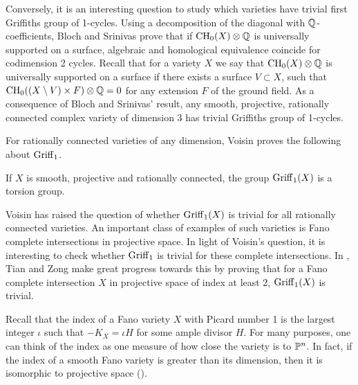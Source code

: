 Conversely, it is an interesting question to study which varieties have trivial first Griffiths group of 1-cycles. Using a decomposition of the diagonal with $\Q$-coefficients, Bloch and Srinivas \cite{BSCorrespondences} prove that if $\CH_0(X) \otimes \Q$ is universally supported on a surface,
algebraic and homological equivalence coincide for codimension 2 cycles. Recall that for a variety $X$ we say that $\CH_0(X) \otimes \Q$ is universally supported on a surface if there exists a surface $V \subset X$, such that $\CH_0((X \setminus V) \times F) \otimes \Q = 0$ for any extension $F$ of the ground field.
As a consequence of Bloch and Srinivas' result, any smooth, projective, rationally connected complex variety of dimension 3 has trivial Griffiths group of 1-cycles.

For rationally connected varieties of any dimension, Voisin proves the following about $\Griff_1$.
\begin{theorem}
	If $X$ is smooth, projective and rationally connected, the group $\Griff_1(X)$ is a torsion group.
\end{theorem}

 Voisin has raised the question of whether $\Griff_1(X)$ is trivial for all rationally connected varieties. An important class of examples of such varieties is Fano complete intersections in projective space. In light of Voisin's question, it is interesting to check whether $\Griff_1$ is trivial for these complete intersections. In \cite{TZ}, Tian and Zong make great progress towards this by proving that for a Fano complete intersection $X$ in projective space of index at least 2, $\Griff_1(X)$ is trivial.
 
 Recall that the index of a Fano variety $X$ with Picard number 1 is the largest integer $\iota$ such that $-K_X = \iota H$ for some ample divisor $H$. For many purposes, one can think of the index as one measure of how close the variety is to $\P^n$. In fact, if the index of a smooth Fano variety is greater than its dimension, then it is isomorphic to projective space (\cite{KO}).

